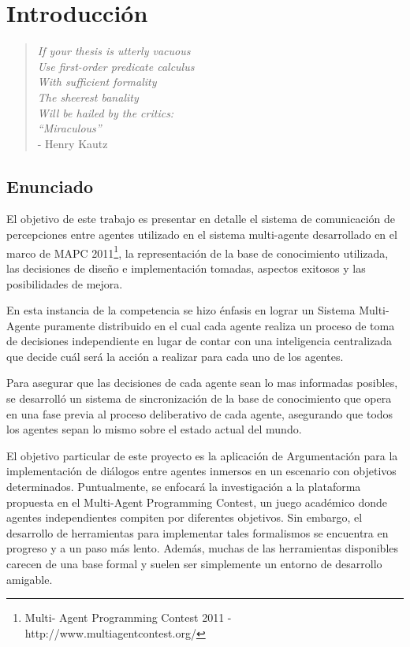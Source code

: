 \chapter{Introducción}
\label{chap:introduccion}

\begin{quote}
\scriptsize{
    \emph{
        If your thesis is utterly vacuous   \\
        Use first-order predicate calculus  \\
            With sufficient formality       \\
            The sheerest banality           \\
        Will be hailed by the critics:      \\
            ``Miraculous''                  \\
        }
    - Henry Kautz
}
\end{quote}

\section{Enunciado}
  \label{sec:enunciado}

  El objetivo de este trabajo es presentar en detalle el sistema de
  comunicación de percepciones entre agentes utilizado en el sistema
  multi-agente desarrollado en el marco de MAPC 2011\footnote{Multi-
  Agent Programming Contest 2011 - http://www.multiagentcontest.org/},
  la representación de la base de conocimiento utilizada, las decisiones
  de diseño e implementación tomadas, aspectos exitosos y las
  posibilidades de mejora.
  
  En esta instancia de la competencia se hizo énfasis en lograr un
  Sistema Multi-Agente puramente distribuido en el cual cada agente
  realiza un proceso de toma de decisiones independiente en lugar de
  contar con una inteligencia centralizada que decide cuál será la
  acción a realizar para cada uno de los agentes. 
  
  Para asegurar que las decisiones de cada agente sean lo mas informadas
  posibles, se desarrolló un sistema de sincronización de la base de
  conocimiento que opera en una fase previa al proceso deliberativo de
  cada agente, asegurando que todos los agentes sepan lo mismo sobre el
  estado actual del mundo.
  
  El objetivo particular de este proyecto es la aplicación de
  Argumentación para la implementación de diálogos entre agentes
  inmersos en un escenario con objetivos determinados.
  Puntualmente, se enfocará la investigación a la plataforma propuesta
  en el Multi-Agent Programming Contest, un juego académico donde
  agentes independientes compiten por diferentes objetivos.
  Sin embargo, el desarrollo de herramientas para implementar tales
  formalismos se encuentra en progreso y a un paso más lento.
  Además, muchas de las herramientas disponibles carecen de una base
  formal y suelen ser simplemente un entorno de desarrollo amigable.

